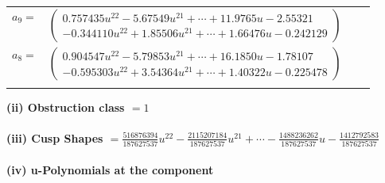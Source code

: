 \documentclass[1p]{elsarticle_modified}
\theoremstyle{definition}
\begin{document}
\begin{tabular}{m{7pt} m{180pt} m{7pt} m{180pt} }
\flushright $a_{9}=$&$\begin{pmatrix}0.757435 u^{22}-5.67549 u^{21}+\cdots+11.9765 u-2.55321\\-0.344110 u^{22}+1.85506 u^{21}+\cdots+1.66476 u-0.242129\end{pmatrix}$ \\
\flushright $a_{8}=$&$\begin{pmatrix}0.904547 u^{22}-5.79853 u^{21}+\cdots+16.1850 u-1.78107\\-0.595303 u^{22}+3.54364 u^{21}+\cdots+1.40322 u-0.225478\end{pmatrix}$\\&\end{tabular}
\flushleft \textbf{(ii) Obstruction class $= 1$}\\~\\
\flushleft \textbf{(iii) Cusp Shapes $= \frac{516876394}{187627537} u^{22}-\frac{2115207184}{187627537} u^{21}+\cdots-\frac{1488236262}{187627537} u-\frac{1412792583}{187627537}$}\\~\\
\newpage\renewcommand{\arraystretch}{1}
\flushleft \textbf{(iv) u-Polynomials at the component}\newline \\
\end{document}
